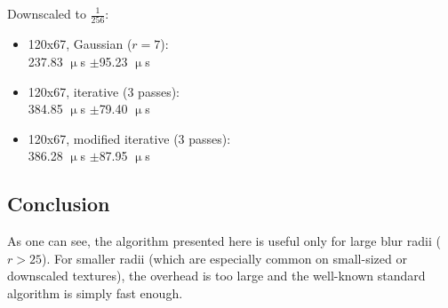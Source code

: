 \documentclass[english,fleqn,10pt,twocolumn]{article}
\begin{document}
Downscaled to $\frac 1{256}$:
\begin{itemize}
    \item 120x67, Gaussian ($r = 7$): \\
        237.83 $\upmu$s $\pm$95.23 $\upmu$s
    \item 120x67, iterative (3 passes): \\
        384.85 $\upmu$s $\pm$79.40 $\upmu$s
    \item 120x67, modified iterative (3 passes): \\
        386.28 $\upmu$s $\pm$87.95 $\upmu$s
\end{itemize}

\subsection{Conclusion}

As one can see, the algorithm presented here is useful only for large blur radii ($r > 25$). For smaller radii (which are especially common on small-sized or downscaled textures), the overhead is too
large and the well-known standard algorithm is simply fast enough.
\end{document}
